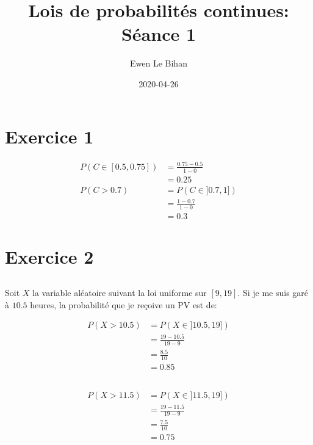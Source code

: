\documentclass{article}
\title{Lois de probabilités continues: Séance 1}
\author{Ewen Le Bihan}
\date{2020-04-26}
\begin{document}
\maketitle

\section{Exercice 1}

\begin{equation*}
    \begin{split}
        P(C \in [0.5, 0.75]) &= \frac{0.75-0.5}{1-0} \\
                             &= 0.25 \\
        P(C > 0.7) &= P(C \in ]0.7, 1]) \\
                   &= \frac{1-0.7}{1-0} \\
                   &= 0.3
    \end{split}
\end{equation*}

\section{Exercice 2}

\subsection{}

Soit $X$ la variable aléatoire suivant la loi uniforme sur $[9, 19]$.
Si je me suis garé à $10.5$ heures, la probabilité que je reçoive un PV est de:

\begin{equation*}
    \begin{split}
        P(X > 10.5) &= P(X \in ]10.5, 19]) \\
                    &= \frac{19-10.5}{19-9} \\
                    &= \frac{8.5}{10} \\
                    &= 0.85
    \end{split}
\end{equation*}

\subsection{}

\begin{equation*}
    \begin{split}
        P(X > 11.5) &= P(X \in ]11.5, 19]) \\
        &= \frac{19-11.5}{19-9} \\
        &= \frac{7.5}{10} \\
        &= 0.75
    \end{split}
\end{equation*}
\end{document}
